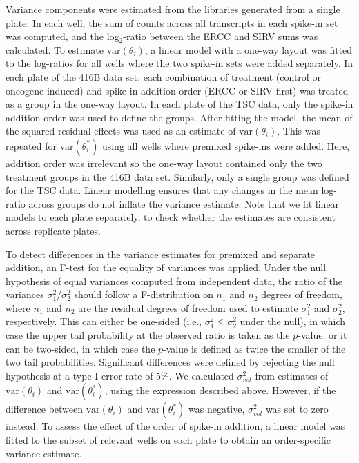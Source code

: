 \documentclass{article}
\newcommand\variance{\mbox{var}}
\begin{document}
Variance components were estimated from the libraries generated from a single plate.
In each well, the sum of counts across all transcripts in each spike-in set was computed, and the log$_2$-ratio between the ERCC and SIRV sums was calculated.
To estimate $\variance(\theta_i)$, a linear model with a one-way layout was fitted to the log-ratios for all wells where the two spike-in sets were added separately.
In each plate of the 416B data set, each combination of treatment (control or oncogene-induced) and spike-in addition order (ERCC or SIRV first) was treated as a group in the one-way layout.
In each plate of the TSC data, only the spike-in addition order was used to define the groups.
After fitting the model, the mean of the squared residual effects was used as an estimate of $\variance(\theta_i)$.
This was repeated for $\variance(\theta^*_i)$ using all wells where premixed spike-ins were added.
Here, addition order was irrelevant so the one-way layout contained only the two treatment groups in the 416B data set.
Similarly, only a single group was defined for the TSC data.
Linear modelling ensures that any changes in the mean log-ratio across groups do not inflate the variance estimate.
Note that we fit linear models to each plate separately, to check whether the estimates are consistent across replicate plates.

To detect differences in the variance estimates for premixed and separate addition, an F-test for the equality of variances was applied.
Under the null hypothesis of equal variances computed from independent data, the ratio of the variances $\sigma^2_1/\sigma^2_2$ should follow a F-distribution on $n_1$ and $n_2$ degrees of freedom, where $n_1$ and $n_2$ are the residual degrees of freedom used to estimate $\sigma^2_1$ and $\sigma^2_2$, respectively.
This can either be one-sided (i.e., $\sigma^2_1 \le \sigma^2_2$ under the null), in which case the upper tail probability at the observed ratio is taken as the $p$-value;
or it can be two-sided, in which case the $p$-value is defined as twice the smaller of the two tail probabilities.
Significant differences were defined by rejecting the null hypothesis at a type I error rate of 5\%.
We calculated $\sigma^2_{vol}$ from estimates of $\variance(\theta_i)$ and $\variance(\theta^*_i)$, using the expression described above.
However, if the difference between $\variance(\theta_i)$ and $\variance(\theta^*_i)$ was negative, $\sigma^2_{vol}$ was set to zero instead.
To assess the effect of the order of spike-in addition, a linear model was fitted to the subset of relevant wells on each plate to obtain an order-specific variance estimate.
\end{document}
